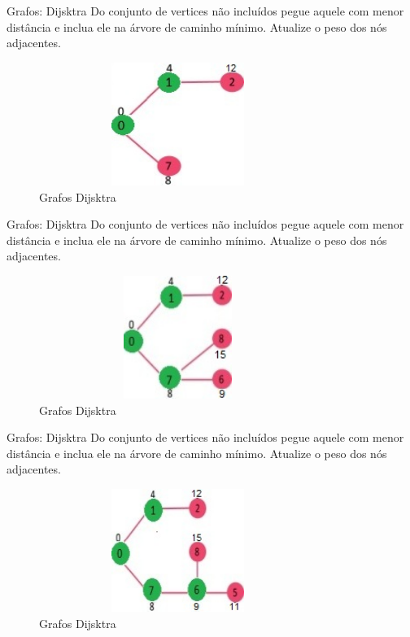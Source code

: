 \begin{frame}
	\begin{block}{Grafos: Dijsktra}
		Do conjunto de vertices não incluídos pegue aquele com menor distância e inclua ele na árvore de caminho mínimo. Atualize o peso dos nós adjacentes.
		\begin{figure}[!htb]
			\centering	  
			\includegraphics[height=4cm, width = 9cm]{./pic/DIJ2.jpg}
			\caption{Grafos Dijsktra \cite{GEEKS_2018}}
		\end{figure}
	\end{block}
\end{frame}

\begin{frame}
	\begin{block}{Grafos: Dijsktra}
		Do conjunto de vertices não incluídos pegue aquele com menor distância e inclua ele na árvore de caminho mínimo. Atualize o peso dos nós adjacentes.
		\begin{figure}[!htb]
			\centering	  
			\includegraphics[height=4cm, width = 9cm]{./pic/DIJ3.jpg}
			\caption{Grafos Dijsktra \cite{GEEKS_2018}}
		\end{figure}
	\end{block}
\end{frame}

\begin{frame}
	\begin{block}{Grafos: Dijsktra}
		Do conjunto de vertices não incluídos pegue aquele com menor distância e inclua ele na árvore de caminho mínimo. Atualize o peso dos nós adjacentes.
		\begin{figure}[!htb]
			\centering	  
			\includegraphics[height=4cm, width = 9cm]{./pic/DIJ4.jpg}
			\caption{Grafos Dijsktra \cite{GEEKS_2018}}
		\end{figure}
	\end{block}
\end{frame}

